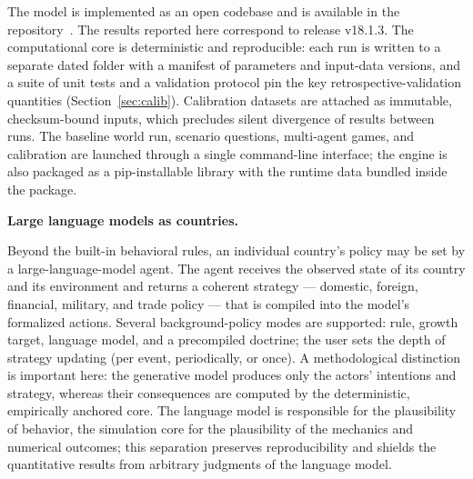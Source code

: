 \documentclass[a4paper,fleqn]{cas-sc}
\begin{document}
The model is implemented as an open codebase and is available in the repository~\citep{theclimateguy2026gim}. 
The results reported here correspond to release
v18.1.3. The computational core is deterministic and
reproducible: each run is written to a separate dated folder with a manifest of parameters and
input-data versions, and a suite of unit tests and a validation protocol pin the key
retrospective-validation quantities (Section~\ref{sec:calib}). Calibration datasets are attached as
immutable, checksum-bound inputs, which precludes silent divergence of results between runs. The
baseline world run, scenario questions, multi-agent games, and calibration are launched through a
single command-line interface; the engine is also packaged as a pip-installable library with the
runtime data bundled inside the package.

\textbf{Large language models as countries.}


Beyond the built-in behavioral rules, an individual
country's policy may be set by a large-language-model agent. The agent receives the observed state of
its country and its environment and returns a coherent strategy --- domestic, foreign, financial,
military, and trade policy --- that is compiled into the model's formalized actions. Several
background-policy modes are supported: rule, growth target, language model, and a precompiled
doctrine; the user sets the depth of strategy updating (per event, periodically, or once). A
methodological distinction is important here: the generative model produces only the actors'
intentions and strategy, whereas their consequences are computed by the deterministic, empirically
anchored core. The language model is responsible for the plausibility of behavior, the simulation
core for the plausibility of the mechanics and numerical outcomes; this separation preserves
reproducibility and shields the quantitative results from arbitrary judgments of the language model.
\end{document}
